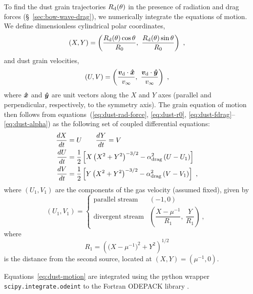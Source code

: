 To find the dust grain trajectories \(R_{\text{d}}(\theta)\) in the presence of
radiation and drag forces (\S~\ref{sec:bow-wave-drag}), we numerically
integrate the equations of motion. We define dimensionless cylindrical
polar coordinates,
\begin{equation}
  \label{eq:dust-XY}
  (X, Y) = \left(\frac{R\grain(\theta) \cos\theta } {R_0}, \ 
    \frac{R\grain(\theta) \sin\theta } {R_0}\right)
  \ ,
\end{equation}
and dust grain velocities,
\begin{equation}
  \label{eq:dust-UV}
  (U, V) = \left( \frac{\bm{v}\grain \cdot \uvec{x}} {v_\infty}, \ 
  \frac{\bm{v}\grain \cdot \uvec{y}} {v_\infty}\right) \ ,
\end{equation}
where \(\bm{\hat{x}}\) and \(\bm{\hat{y}}\) are unit vectors along the \(X\)
and \(Y\) axes (parallel and perpendicular, respectively, to the
symmetry axis).  The grain equation of motion then follows from
equations~(\ref{eq:dust-rad-force}, \ref{eq:dust-r0},
\ref{eq:dust-fdrag}--\ref{eq:dust-alpha}) as the following set of
coupled differential equations:
\begin{gather}
  \label{eq:dust-motion}
  \begin{aligned}
    \frac{d X}{d t} &= U \quad\quad
    \frac{d Y}{d t} = V \\
    \frac{d U}{d t} &= \frac12 \left[  
      X \left(X^2 + Y^2\right)^{-3/2} - \alpha_{\text{drag}}^2 \left(U - U_1\right)
    \right] \\
    \frac{d V}{d t} &= \frac12 \left[  
      Y \left(X^2 + Y^2\right)^{-3/2} - \alpha_{\text{drag}}^2 \left(V - V_1\right)
    \right] \ ,
  \end{aligned}
\end{gather}
where \((U_1, V_1)\) are the components of the gas velocity (assumed
fixed), given by
\begin{equation}
  \label{eq:dust-gas-velocities}
  (U_1, V_1) = 
  \begin{cases}
    \text{parallel stream} & (-1, 0)\\
    \text{divergent stream} &
    \left( \dfrac{X - \mu^{-1}}{R_1},\ \dfrac{Y}{R_1}\right) \ ,
  \end{cases}
\end{equation}
where
\begin{equation}
  \label{eq:dust-R1}
  R_1 = \left( \bigl(X - \mu^{-1}\bigr)^2 + Y^2 \right)^{1/2}
\end{equation}
is the distance from the second source, located at
\((X, Y) = (\mu^{-1}, 0)\).

Equations~\eqref{eq:dust-motion} are integrated using the python
wrapper \texttt{scipy.integrate.odeint} to the Fortran ODEPACK library
\citep{Hindmarsh:1983a, Jones:2001a}.

